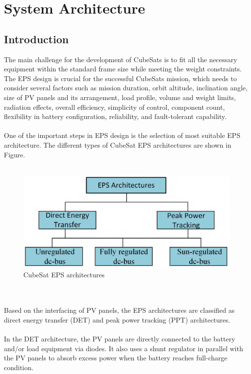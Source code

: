 \chapter{System Architecture}
\section[Introduction]{Introduction}

The main challenge for the development of CubeSats is to fit all the necessary equipment within the standard frame size while meeting the weight constraints. The EPS design is crucial for the successful CubeSats mission, which needs to consider several factors such as mission duration, orbit altitude, inclination angle, size of PV panels and its arrangement, load profile, volume and weight limits, radiation effects, overall efficiency, simplicity of control, component count, flexibility in battery configuration, reliability, and fault-tolerant capability. 
\\ \\
One of the important steps in EPS design is the selection of most suitable EPS architecture. The different types of CubeSat EPS architectures are shown in Figure. 
\\ \\
\begin{figure}[h]
	\centering
	\includegraphics[width=\columnwidth]{IMGS/EPSarchitectures.jpg}
	\caption{CubeSat EPS architectures}
	\label{fig:arch}
\end{figure} 
\\ \\
Based on the interfacing of PV panels, the EPS architectures are classified as direct energy transfer (DET) and peak power tracking (PPT) architectures. 
\\ \\
In the DET architecture, the PV panels are directly connected to the battery and/or load equipment via diodes. It also uses a shunt regulator in parallel with the PV panels to absorb excess power when the battery reaches full-charge condition.
